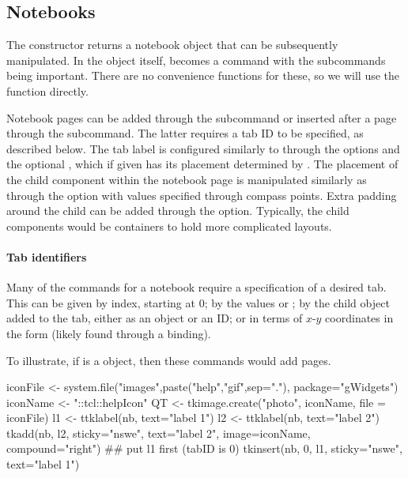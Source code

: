 \subsection{Notebooks}
\label{sec:tcltk:notebooks}

The  constructor returns a notebook object that can be subsequently manipulated. In \TK\/ the object itself, becomes a command with the subcommands being important. There are no convenience functions for these, so we will use the  function directly.

Notebook pages can be added through the  subcommand or inserted after a page through the  subcommand. The latter requires a tab ID to be specified, as described below. The tab label is configured similarly to  through the options  and the optional , which if given has its placement determined by . 
The placement of the child component within the notebook page is manipulated similarly as  through the   option with values specified through compass points. Extra padding around the child can be added through the  option. Typically, the child components would be containers to hold more complicated layouts. 

\paragraph{Tab identifiers} %
Many of the commands for a notebook require a specification of a desired tab. This can be given by index, starting at 0; by the values  or ; by the child object added to the tab, either as an \R\/ object or an ID; or in terms of $x$-$y$ coordinates in the form  (likely found through a binding).

To illustrate, if  is a  object, then these commands would add pages.
\begin{Schunk}
\begin{Sinput}
 iconFile <- system.file("images",paste("help","gif",sep="."),
                         package="gWidgets")
 iconName <- "::tcl::helpIcon"
 QT <- tkimage.create("photo", iconName, file = iconFile)
 l1 <- ttklabel(nb, text="label 1")
 l2 <- ttklabel(nb, text="label 2")
 tkadd(nb, l2, sticky="nswe", text="label 2", 
     image=iconName, compound="right")
 ## put l1 first (tabID is 0)
 tkinsert(nb, 0, l1, sticky="nswe", text="label 1")
\end{Sinput}
\end{Schunk}

